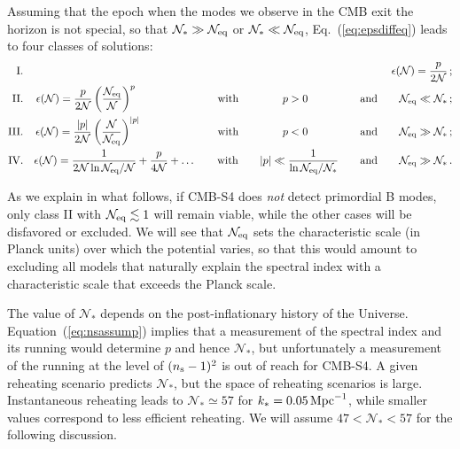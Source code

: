 Assuming that the epoch when the modes we observe in the CMB exit the horizon is not special, so that $\mathcal{N}_\ast\gg\mathcal{N}_{\rm eq}$ or $\mathcal{N}_\ast\ll\mathcal{N}_{\rm eq}$, Eq.~(\ref{eq:epsdiffeq}) leads to four classes of solutions:
\begin{eqnarray}
{\rm I.}&&\epsilon(\mathcal{N})=\frac{p}{2\mathcal{N}}\,;\label{eq:classI}\\
{\rm II.}&&\epsilon(\mathcal{N})=\frac{p}{2\mathcal{N}}\left(\frac{\mathcal{N}_{\rm eq}}{\mathcal{N}}\right)^p\hspace{1.92cm}\qquad{\rm with}\qquad \hspace{7.3mm}p>0 \hspace{1.0cm}\qquad{\rm and}\qquad\mathcal{N}_{\rm eq}\ll\mathcal{N}_\ast\,;\label{eq:classII}\\
{\rm III.}&&\epsilon(\mathcal{N})=\frac{|p|}{2\mathcal{N}}\left(\frac{\mathcal{N}}{\mathcal{N}_{\rm eq}}\right)^{|p|}\hspace{1.77cm}\qquad{\rm with}\qquad \hspace{7.3mm}p<0 \hspace{1.0cm}\qquad{\rm and}\qquad\mathcal{N}_{\rm eq}\gg\mathcal{N}_\ast\,;\label{eq:classIII}\\
{\rm IV.}&&\epsilon(\mathcal{N})=\frac{1}{2\mathcal{N}\ln\mathcal{N}_{\rm eq}/\mathcal{N}}+\frac{p}{4\mathcal{N}}+\dots\qquad{\rm with}\qquad |p|\ll\frac{1}{\ln\mathcal{N}_{\rm eq}/\mathcal{N}_\ast}\qquad{\rm and}\qquad \mathcal{N}_{\rm eq}\gg\mathcal{N}_\ast\,.\label{eq:classIV}
\end{eqnarray}

As we explain in what follows, if CMB-S4 does {\it not\/} detect primordial B modes, only class II with $\mathcal{N}_{\rm eq}\lesssim 1$ will remain viable, while the other cases will be disfavored or excluded. We will see that $\mathcal{N}_{\rm eq}$ sets the characteristic scale (in Planck units) over which the potential varies, so that this would amount to excluding all models that naturally explain the spectral index with a characteristic scale that exceeds the Planck scale. 

The value of $\mathcal{N}_\ast$ depends on the post-inflationary history of the Universe. Equation~(\ref{eq:nsassump}) implies that a measurement of the spectral index and its running would determine $p$ and hence $\mathcal{N}_\ast$, but unfortunately a measurement of the running at the level of $(n_{\rm s}-1)^2$ is out of reach for CMB-S4. A given reheating scenario predicts $\mathcal{N}_\ast$, but the space of reheating scenarios is large. Instantaneous reheating leads to $\mathcal{N}_\ast\simeq 57$ for $k_\ast=0.05\,  {\rm Mpc}^{-1}$, while smaller values correspond to less efficient reheating. We will assume $47<\mathcal{N}_\ast<57$ for the following discussion. 

